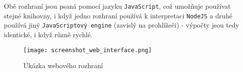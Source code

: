 Obě rozhraní jsou psaná pomocí jazyku \texttt{JavaScript}, což umožňuje používat stejné knihovny, i když jedno rozhraní používá k interpretaci \texttt{NodeJS} a druhé používá jiný \texttt{JavaScriptový engine} (zavislý na prohlížeči) - výpočty jsou tedy identické, i když různě rychlé.

\begin{figure}[!ht]
    \centering
    \texttt{[image: screenshot\_web\_interface.png]}
    \caption{Ukázka webového rozhraní}
    \label{fig:web_interface}
\end{figure}